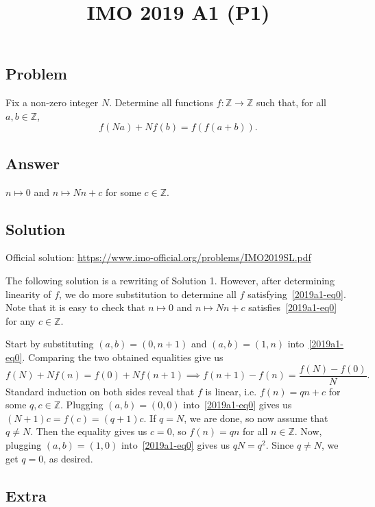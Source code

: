 \documentclass{article}
\title{IMO 2019 A1 (P1)}
\author{}
\date{}
\newcommand{\Z}{\mathbb{Z}}
\begin{document}
\maketitle



\subsection*{Problem}

Fix a non-zero integer $N$.
Determine all functions $f : \Z \to \Z$ such that, for all $a, b \in \Z$,
\[ f(Na) + N f(b) = f(f(a + b)). \tag{*}\label{2019a1-eq0} \]



\subsection*{Answer}

$n \mapsto 0$ and $n \mapsto Nn + c$ for some $c \in \Z$.



\subsection*{Solution}

Official solution: \url{https://www.imo-official.org/problems/IMO2019SL.pdf}

The following solution is a rewriting of Solution 1.
However, after determining linearity of $f$, we do more substitution to determine all $f$ satisfying~\eqref{2019a1-eq0}.
Note that it is easy to check that $n \mapsto 0$ and $n \mapsto Nn + c$ satisfies~\eqref{2019a1-eq0} for any $c \in \Z$.

Start by substituting $(a, b) = (0, n + 1)$ and $(a, b) = (1, n)$ into~\eqref{2019a1-eq0}.
Comparing the two obtained equalities give us
\[ f(N) + N f(n) = f(0) + N f(n + 1) \implies f(n + 1) - f(n) = \frac{f(N) - f(0)}{N}. \]
Standard induction on both sides reveal that $f$ is linear, i.e. $f(n) = qn + c$ for some $q, c \in \Z$.
Plugging $(a, b) = (0, 0)$ into~\eqref{2019a1-eq0} gives us $(N + 1) c = f(c) = (q + 1) c$.
If $q = N$, we are done, so now assume that $q \neq N$.
Then the equality gives us $c = 0$, so $f(n) = qn$ for all $n \in \Z$.
Now, plugging $(a, b) = (1, 0)$ into~\eqref{2019a1-eq0} gives us $qN = q^2$.
Since $q \neq N$, we get $q = 0$, as desired.



\newpage

\subsection*{Extra}
\end{document}
